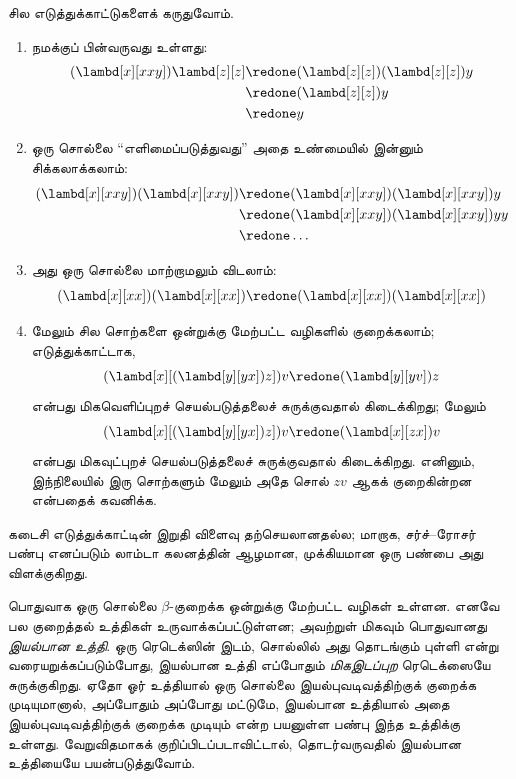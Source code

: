 \documentclass[../../../include/open-logic-section]{subfiles}
\begin{document}
சில எடுத்துக்காட்டுகளைக் கருதுவோம்.
\begin{enumerate}
\item நமக்குப் பின்வருவது உள்ளது:
\begin{align*}
(\lambd[x][xxy]) \lambd[z][z] & \redone (\lambd[z][z])(\lambd[z][z]) y \\
& \redone (\lambd[z][z]) y \\
& \redone y
\end{align*}
\item ஒரு சொல்லை “எளிமைப்படுத்துவது” அதை உண்மையில் இன்னும் சிக்கலாக்கலாம்:
\begin{align*}
(\lambd[x][xxy])(\lambd[x][xxy]) & \redone (\lambd[x][xxy])(\lambd[x][xxy])y \\
& \redone (\lambd[x][xxy])(\lambd[x][xxy])yy \\
& \redone \dots
\end{align*}
\item அது ஒரு சொல்லை மாற்றாமலும் விடலாம்:
\[
(\lambd[x][xx])(\lambd[x][xx]) \redone (\lambd[x][xx])(\lambd[x][xx])
\]
\item மேலும் சில சொற்களை ஒன்றுக்கு மேற்பட்ட வழிகளில் குறைக்கலாம்;
  எடுத்துக்காட்டாக,
\[
(\lambd[x][(\lambd[y][yx]) z]) v \redone (\lambd[y][yv]) z
\]
என்பது மிகவெளிப்புறச் செயல்படுத்தலைச் சுருக்குவதால் கிடைக்கிறது; மேலும்
\[
(\lambd[x][(\lambd[y][yx]) z]) v \redone (\lambd[x][zx]) v
\]
என்பது மிகவுட்புறச் செயல்படுத்தலைச் சுருக்குவதால் கிடைக்கிறது. எனினும்,
இந்நிலையில் இரு சொற்களும் மேலும் அதே சொல் $zv$ ஆகக் குறைகின்றன என்பதைக்
கவனிக்க.
\end{enumerate}

கடைசி எடுத்துக்காட்டின் இறுதி விளைவு தற்செயலானதல்ல; மாறாக, சர்ச்--ரோசர் பண்பு
எனப்படும் லாம்டா கலனத்தின் ஆழமான, முக்கியமான ஒரு பண்பை அது விளக்குகிறது.

\begin{digress}
  பொதுவாக ஒரு சொல்லை $\beta$-குறைக்க ஒன்றுக்கு மேற்பட்ட வழிகள் உள்ளன.
  எனவே பல குறைத்தல் உத்திகள் உருவாக்கப்பட்டுள்ளன; அவற்றுள் மிகவும் பொதுவானது
  \emph{இயல்பான உத்தி}. ஒரு ரெடெக்ஸின் இடம், சொல்லில் அது தொடங்கும் புள்ளி
  என்று வரையறுக்கப்படும்போது, இயல்பான உத்தி எப்போதும் \emph{மிகஇடப்புற}
  ரெடெக்ஸையே சுருக்குகிறது. ஏதோ ஓர் உத்தியால் ஒரு சொல்லை இயல்புவடிவத்திற்குக்
  குறைக்க முடியுமானால், அப்போதும் அப்போது மட்டுமே, இயல்பான உத்தியால் அதை
  இயல்புவடிவத்திற்குக் குறைக்க முடியும் என்ற பயனுள்ள பண்பு இந்த உத்திக்கு
  உள்ளது. வேறுவிதமாகக் குறிப்பிடப்படாவிட்டால், தொடர்வருவதில் இயல்பான உத்தியையே
  பயன்படுத்துவோம்.
\end{digress}
\end{document}
